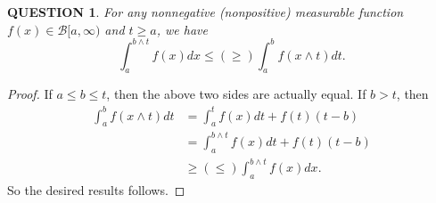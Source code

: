 \documentclass[12pt]{article}
\renewcommand{\b}{\mathscr{B}}
\renewcommand{\(}{\left(}%
\renewcommand{\)}{\right)}%
\renewcommand{\[}{\left[}%
\renewcommand{\]}{\right]}%
\newtheorem{question}{QUESTION}[section]}
\newtheorem{proof}{Proof.}}
\begin{document}
   
   \begin{question}
	For any nonnegative (nonpositive) measurable function $f(x)\in\b[a,\infty)$ and $t \geq a$, we have
	\begin{equation*}
		\int_a^{b\wedge t}f(x)dx\leq (\geq)\int_a^b f(x\wedge t )dt. 
	\end{equation*}
  \end{question}
  \begin{proof}
  	If $a\leq b\leq t$, then the above two sides are actually equal. If $b>t$, then 
  	\begin{equation*}
  		\begin{split}
  			\int_a^b f(x\wedge t )dt&=\int_a^t f(x)dt+f(t)(t-b)\\
  			&=\int_a^{b\wedge t} f(x)dt+f(t)(t-b)\\
  			&\geq (\leq )\int_a^{b\wedge t}f(x)dx.
  		\end{split}
  	\end{equation*}
  	So the desired results follows.
  \end{proof}
  
\end{document}
